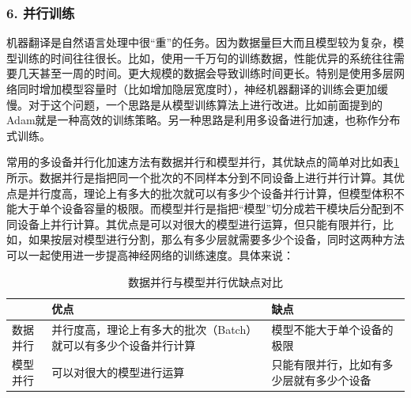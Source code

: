 \subsubsection{6. 并行训练}

\parinterval 机器翻译是自然语言处理中很“重”的任务。因为数据量巨大而且模型较为复杂，模型训练的时间往往很长。比如，使用一千万句的训练数据，性能优异的系统往往需要几天甚至一周的时间。更大规模的数据会导致训练时间更长。特别是使用多层网络同时增加模型容量时（比如增加隐层宽度时），神经机器翻译的训练会更加缓慢。对于这个问题，一个思路是从模型训练算法上进行改进。比如前面提到的Adam就是一种高效的训练策略。另一种思路是利用多设备进行加速，也称作分布式训练。

\parinterval 常用的多设备并行化加速方法有数据并行和模型并行，其优缺点的简单对比如表\ref{tab:10-9}所示。数据并行是指把同一个批次的不同样本分到不同设备上进行并行计算。其优点是并行度高，理论上有多大的批次就可以有多少个设备并行计算，但模型体积不能大于单个设备容量的极限。而模型并行是指把“模型”切分成若干模块后分配到不同设备上并行计算。其优点是可以对很大的模型进行运算，但只能有限并行，比如，如果按层对模型进行分割，那么有多少层就需要多少个设备，同时这两种方法可以一起使用进一步提高神经网络的训练速度。具体来说：

\begin{table}[htp]
\centering
\caption{ 数据并行与模型并行优缺点对比}
\label{tab:10-9}
\begin{tabular}{l | p{12em}  p{12em} }
	 		 &优点		&缺点 \\ \hline
\rule{0pt}{15pt}	数据并行 &并行度高，理论上有多大的批次（Batch）就可以有多少个设备并行计算	&模型不能大于单个设备的极限 \\
\rule{0pt}{15pt}	模型并行	&可以对很大的模型进行运算	&只能有限并行，比如有多少层就有多少个设备 \\
\end{tabular}
\end{table}


